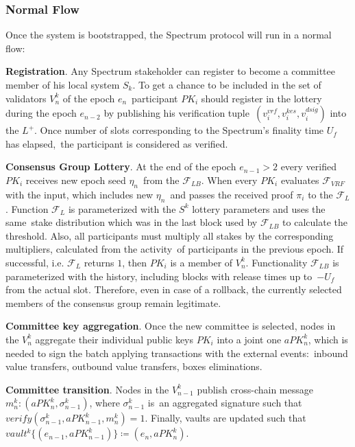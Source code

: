\subsubsection{Normal Flow}\label{subsubsec:normal-flow}
Once the system is bootstrapped, the Spectrum protocol will run in a normal flow:
\begin{legal}
    \item \textbf{Registration}.
    Any Spectrum stakeholder can register to become a committee member of his local system $S_k$.
    To get a chance to be included in the set of validators $V^k_n$ of the epoch $e_n$\
    participant $PK_i$ should register in the lottery during the epoch $e_{n-2}$ by publishing his verification tuple\
    ${(v_i^{vrf}, v_i^{kes}, v_i^{dsig})}$ into the $L^+$.
    Once number of slots corresponding to the Spectrum's finality time $U_f$ has elapsed,\
    the participant is considered as verified.

    \item \textbf{Consensus Group Lottery}.
    At the end of the epoch ${e_{n-1} \gt 2}$ every verified $PK_i$ receives new epoch seed $\eta_n$\
    from the ${\mathcal{F}}_{LB}$.
    When every $PK_i$ evaluates ${\mathcal{F}}_{VRF}$ with the input, which includes new $\eta_n$\
    and passes the received proof $\pi_i$ to the ${\mathcal{F}}_{L}$.
    Function ${\mathcal{F}}_{L}$ is parameterized with the $S^k$ lottery parameters and uses the same\
    stake distribution which was in the last block used by ${\mathcal{F}}_{LB}$ to calculate the threshold.
    Also, all participants must multiply all stakes by the corresponding multipliers, calculated from the activity\
    of participants in the previous epoch.
    If successful, i.e. ${\mathcal{F}}_{L}$ returns $1$, then $PK_i$ is a member of $V^k_n$.
    Functionality ${\mathcal{F}}_{LB}$ is parameterized with the history, including blocks with release times up to\
    ${-U_f}$ from the actual slot.
    Therefore, even in case of a rollback, the currently selected members of the consensus group remain legitimate.

    \item \textbf{Committee key aggregation}.
    Once the new committee is selected, nodes in the $V^k_n$ aggregate their individual public keys $PK_i$ into
    a joint one $aPK^k_n$, which is needed to sign the batch applying transactions with the external events:\
    inbound value transfers, outbound value transfers, boxes eliminations.

    \item \textbf{Committee transition}.
    Nodes in the $V^k_{n - 1}$ publish cross-chain message ${m^k_n : (aPK^k_n, \sigma^k_{n-1})}$, where $\sigma^k_{n-1}$ is\
    an aggregated signature such that ${verify(\sigma^k_{n-1}, aPK^k_{n-1}, m^k_n) = 1}$.
    Finally, vaults are updated such that ${vault^k\{(e_{n-1}, aPK^k_{n-1})\} \coloneqq(e_n, aPK^k_n)}$.


\end{legal}

